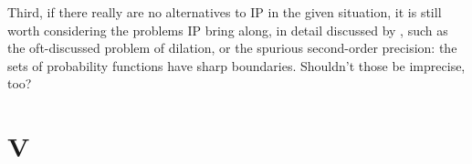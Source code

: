 \documentclass[11pt, a4paper]{scrartcl}
\begin{document}
Third, if there really are no alternatives to IP in the given situation, it is still worth considering the problems IP bring along, in detail discussed by \citep{sep-imprecise-probabilities}, such as the oft-discussed problem of dilation, or the spurious second-order precision: the sets of probability functions have sharp boundaries. Shouldn't those be imprecise, too?  

\section{V}


\begin{singlespacing}
\printbibliography{}
\end{singlespacing}
\end{document}
